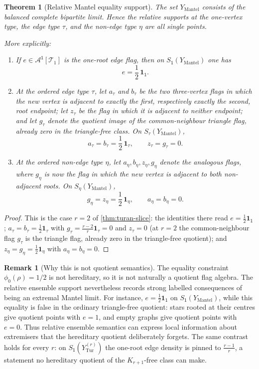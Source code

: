 \documentclass[11pt]{article}
\newtheorem{theorem}{Theorem}
\theoremstyle{definition}
\newtheorem{remark}[remark]{Remark}
\newcommand{\A}{\mathcal{A}}
\newcommand{\T}{\mathcal{T}}
\newcommand{\one}{\mathbf 1}
\newcommand{\vtype}{\mathsf{1}}
\begin{document}
\begin{theorem}[Relative Mantel equality support]\label{thm:relative-mantel}
The set $Y_{\mathrm{Mantel}}$ consists of the balanced complete bipartite limit.  Hence
the relative supports at the one-vertex type, the edge type $\tau$, and the non-edge type
$\eta$ are all single points.

More explicitly:
\begin{enumerate}[label=\textup{(\roman*)}, leftmargin=2.5em]
  \item If $e\in\A^{\vtype}[\T_1]$ is the one-root edge flag, then on
        $S_{\vtype}(Y_{\mathrm{Mantel}})$ one has
        \[
          e=\frac12\,\one_{\vtype} .
        \]
  \item At the ordered edge type $\tau$, let $a_\tau$ and $b_\tau$ be the two
        three-vertex flags in which the new vertex is adjacent to exactly the first,
        respectively exactly the second, root endpoint; let $z_\tau$ be the flag in
        which it is adjacent to neither endpoint; and let $g_\tau$ denote the quotient
        image of the common-neighbour triangle flag, already zero in the triangle-free
        class.  On $S_\tau(Y_{\mathrm{Mantel}})$,
        \[
          a_\tau=b_\tau=\frac12\,\one_\tau,
          \qquad
          z_\tau=g_\tau=0 .
        \]
  \item At the ordered non-edge type $\eta$, let $a_\eta,b_\eta,z_\eta,g_\eta$ denote the
        analogous flags, where $g_\eta$ is now the flag in which the new vertex is
        adjacent to both non-adjacent roots.  On $S_\eta(Y_{\mathrm{Mantel}})$,
        \[
          g_\eta=z_\eta=\frac12\,\one_\eta,
          \qquad
          a_\eta=b_\eta=0 .
        \]
\end{enumerate}
\end{theorem}

\begin{proof}
This is the case $r=2$ of \cref{thm:turan-slice}: the identities there read
$e=\frac12\one_{\vtype}$; $a_\tau=b_\tau=\frac12\one_\tau$ with
$g_\tau=\frac{r-2}{r}\one_\tau=0$ and $z_\tau=0$ (at $r=2$ the common-neighbour flag
$g_\tau$ is the triangle flag, already zero in the triangle-free quotient); and
$z_\eta=g_\eta=\frac12\one_\eta$ with $a_\eta=b_\eta=0$.
\end{proof}

\begin{remark}[Why this is not quotient semantics]
The equality constraint $\phi_0(\rho)=1/2$ is not hereditary, so it is not naturally a
quotient flag algebra.  The relative ensemble support nevertheless records strong
labelled consequences of being an extremal Mantel limit.  For instance,
$e=\frac12\one_{\vtype}$ on $S_{\vtype}(Y_{\mathrm{Mantel}})$, while this equality is false in the
ordinary triangle-free quotient: stars rooted at their centres give quotient points
with $e=1$, and empty graphs give quotient points with $e=0$.  Thus relative ensemble semantics can express
local information about extremisers that the hereditary quotient deliberately forgets.
The same contrast holds for every $r$: on $S_{\vtype}(Y_{\mathrm{Tur}}^{(r)})$ the
one-root edge density is pinned to $\frac{r-1}r$, a statement no hereditary quotient of
the $K_{r+1}$-free class can make.
\end{remark}
\end{document}
